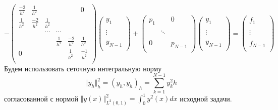 \documentclass[12pt]{article}
\begin{document}
\[
	-\left(\begin{array}{cccccc}
			\frac{-2}{h^2} & \frac{1}{h^2}  &               &               &                & 0              \\
			\frac{1}{h^2}  & \frac{-2}{h^2} & \frac{1}{h^2} &               &                &                \\
			               &                & \cdots        & \cdots        &                &                \\
			               &                &               & \frac{1}{h^2} & \frac{-2}{h^2} & \frac{1}{h^2}  \\
			0              &                &               &               & \frac{1}{h^2}  & \frac{-1}{h^2} \\
		\end{array}\right)
	\left(\begin{array}{c}
			y_{1}   \\
			\\
			\vdots  \\
			\\
			y_{N-1} \\
		\end{array}\right)
	+
	\left(\begin{array}{ccc}
			p_1 &        & 0       \\
			    &        &         \\
			    & \ddots &         \\
			    &        &         \\
			0   &        & p_{N-1} \\
		\end{array}\right)
	\left(\begin{array}{c}
			y_{1}   \\
			\\
			\vdots  \\
			\\
			y_{N-1} \\
		\end{array}\right)
	=
	\left(\begin{array}{c}
			f_{1}   \\
			\\
			\vdots  \\
			\\
			f_{N-1} \\
		\end{array}\right)
\]
Будем использовать сеточную интегральную норму
\[\Vert y_h\Vert^2_h = (y_h,y_h)_h= \sum_{k=1}^{N-1}y^2_kh\]
согласованной с нормой $\Vert y(x)\Vert^2_{L^2(0,1)} = \int_0^1y^2(x)dx$ исходной задачи.
\end{document}
